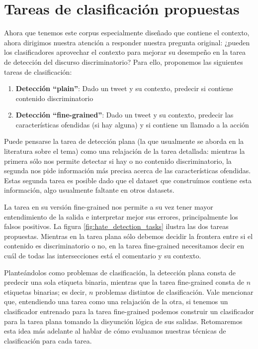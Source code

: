 \section{Tareas de clasificación propuestas}



Ahora que tenemos este corpus especialmente diseñado que contiene el contexto, ahora dirigimos nuestra atención a responder nuestra pregunta original: ¿pueden los clasificadores aprovechar el contexto para mejorar su desempeño en la tarea de detección del discurso discriminatorio? Para ello, proponemos las siguientes tareas de clasificación:

\begin{enumerate}
    \item \textbf{Detección ``plain''}: Dado un tweet y su contexto, predecir si contiene contenido discriminatorio
    \item \textbf{Detección ``fine-grained''}: Dado un tweet y su contexto, predecir las características ofendidas (si hay alguna) y si contiene un llamado a la acción
\end{enumerate}


Puede pensarse la tarea de detección plana (la que usualmente se aborda en la literatura sobre el tema) como una relajación de la tarea detallada: mientras la primera sólo nos permite detectar si hay o no contenido discriminatorio, la segunda nos pide información más precisa acerca de las características ofendidas. Estas segunda tarea es posible dado que el dataset que construímos contiene esta información, algo usualmente faltante en otros datasets.

La tarea en su versión fine-grained nos permite a su vez tener mayor entendimiento de la salida e interpretar mejor sus errores, principalmente los falsos positivos. La figura \ref{fig:hate_detection_tasks} ilustra las dos tareas propuestas. Mientras en la tarea plana sólo debemos decidir la frontera entre si el contenido es discriminatorio o no, en la tarea fine-grained necesitamos decir en cuál de todas las intersecciones está el comentario y su contexto.

Planteándolos como problemas de clasificación, la detección plana consta de predecir una sola etiqueta binaria, mientras que la tarea fine-grained consta de $n$ etiquetas binarias; es decir, $n$ problemas distintos de clasificación. Vale mencionar que, entendiendo una tarea como una relajación de la otra, si tenemos un clasificador entrenado para la tarea fine-grained podemos construir un clasificador para la tarea plana tomando la disyunción lógica de sus salidas. Retomaremos esta idea más adelante al hablar de cómo evaluamos nuestras técnicas de clasificación para cada tarea.

